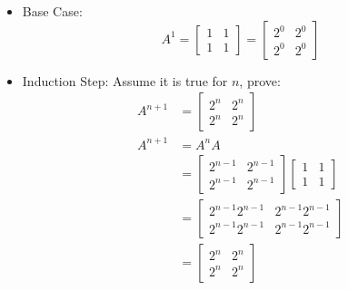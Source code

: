 \documentclass[letterpaper, 12pt]{math}
\begin{document}
\begin{itemize}
  \item Base Case:
  \[ A^1 = \begin{bmatrix}1 & 1 \\ 1 & 1\end{bmatrix} =
    \begin{bmatrix}2^0 & 2^0 \\ 2^0 & 2^0\end{bmatrix} \]
  \item Induction Step: Assume it is true for \( n \), prove:
  \begin{align*}
    A^{n+1} &= \begin{bmatrix}2^n & 2^n \\ 2^n & 2^n\end{bmatrix} \\
    A^{n+1} &= A^nA \\
    &= \begin{bmatrix}2^{n-1} & 2^{n-1} \\ 2^{n-1} & 2^{n-1}\end{bmatrix}
      \begin{bmatrix}1 & 1 \\ 1 & 1\end{bmatrix} \\
    &= \begin{bmatrix}2^{n-1}2^{n-1} & 2^{n-1}2^{n-1} \\
      2^{n-1}2^{n-1} & 2^{n-1}2^{n-1}\end{bmatrix} \\
    &= \begin{bmatrix}2^n & 2^n \\ 2^n & 2^n\end{bmatrix}
  \end{align*}
\end{itemize}
\end{document}
